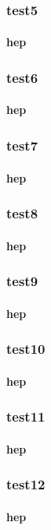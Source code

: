 \documentclass[a4paper,twoside,final]{book} %
\theoremstyle{definition}
\begin{document}
\subsubsection{test5}\paragraph{hep}
\subsubsection{test6}\paragraph{hep}
\subsubsection{test7}\paragraph{hep}
\subsubsection{test8}\paragraph{hep}
\subsubsection{test9}\paragraph{hep}
\subsubsection{test10}\paragraph{hep}
\subsubsection{test11}\paragraph{hep}
\subsubsection{test12}\paragraph{hep}
\end{document}
